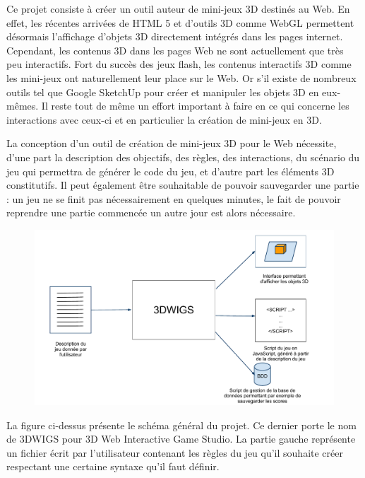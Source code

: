 Ce projet consiste à créer un outil auteur de mini-jeux 3D destinés au Web.
En effet, les récentes arrivées de HTML 5 et d'outils 3D comme WebGL permettent désormais l'affichage d'objets 3D directement
intégrés dans les pages internet.
Cependant, les contenus 3D dans les pages Web ne sont actuellement que très peu interactifs.
Fort du succès des jeux flash, les contenus interactifs 3D comme les mini-jeux ont naturellement leur place sur le Web.
Or s'il existe de nombreux outils tel que Google SketchUp pour créer et manipuler les objets 3D en eux-mêmes.
Il reste tout de même un effort important à faire en ce qui concerne les interactions avec ceux-ci et en particulier la création de mini-jeux en 3D.


\vspace{0.5cm}

La conception d'un outil de création de mini-jeux 3D pour le Web nécessite, d'une part la description des objectifs, des règles, des interactions, 
du scénario du jeu qui permettra de générer le code du jeu, et d'autre part les éléments 3D constitutifs.
Il peut également être souhaitable de pouvoir sauvegarder une partie :
un jeu ne se finit pas nécessairement en quelques minutes, le fait de pouvoir reprendre une partie commencée un autre jour est alors nécessaire.

\vspace{0.5cm}

\begin{figure}[h]
 \centering
 \includegraphics[width=\textwidth]{img/schema_general}
\end{figure}

\vspace{0.8cm}

La figure ci-dessus présente le schéma général du projet.
Ce dernier porte le nom de 3DWIGS pour 3D Web Interactive Game Studio.
La partie gauche représente un fichier écrit par l'utilisateur contenant les règles du jeu qu'il souhaite créer respectant
une certaine syntaxe qu'il faut définir.

